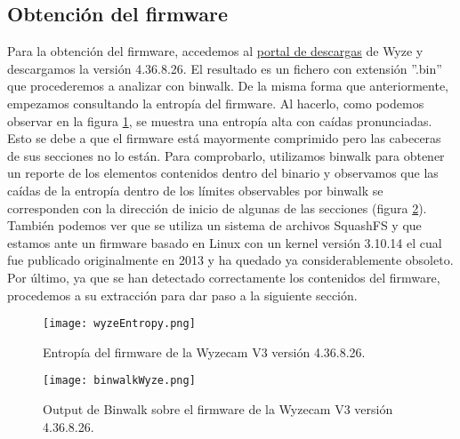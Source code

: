 \subsection{Obtención del firmware}
Para la obtención del firmware, accedemos al \href{https://support.wyze.com/hc/en-us/articles/360024852172-Release-Notes-Firmware}{portal de descargas}
de Wyze y descargamos la versión 4.36.8.26. El resultado es un fichero
con extensión ''.bin'' que procederemos a analizar con binwalk\cite{binwalk}. De la misma forma que anteriormente, empezamos consultando 
la entropía del firmware. Al hacerlo, como podemos observar en la figura \ref{fig:wyzeEntropy}, se muestra una entropía alta con caídas 
pronunciadas. Esto se debe a que el firmware está mayormente comprimido pero las cabeceras de sus secciones no lo están. Para comprobarlo,
utilizamos binwalk para obtener un reporte de los elementos contenidos dentro del binario y observamos que las caídas de 
la entropía dentro de los límites observables por binwalk se corresponden con la dirección de inicio de algunas de las secciones 
(figura \ref{fig:binwalkWyze}). También podemos ver que se utiliza un sistema de archivos SquashFS y que estamos ante un firmware basado
en Linux con un kernel versión 3.10.14 el cual fue publicado originalmente en 2013 y ha quedado ya considerablemente obsoleto. Por último, ya que se 
han detectado correctamente los contenidos del firmware, procedemos a su extracción para dar paso a la siguiente sección.

\begin{figure}[H]
    \centering
    \texttt{[image: wyzeEntropy.png]}
    \caption{Entropía del firmware de la Wyzecam V3 versión 4.36.8.26.}
    \label{fig:wyzeEntropy}
\end{figure}

\begin{figure}[H]
    \centering
    \texttt{[image: binwalkWyze.png]}
    \caption{Output de Binwalk sobre el firmware de la Wyzecam V3 versión 4.36.8.26.}
    \label{fig:binwalkWyze}
\end{figure}

